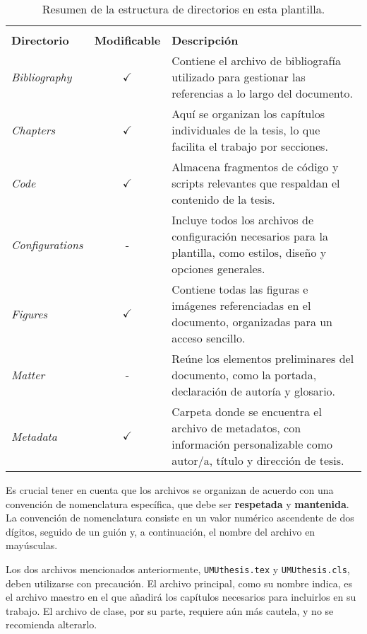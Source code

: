 {\begin{table}[!htpb]
    \setlength{\extrarowheight}{2pt}
    \caption[Estructura de directorios y organización de archivos]{Resumen de la estructura de directorios en esta plantilla.}
    \label{tab:file-structure}
    \begin{tabularx}{\textwidth}{lcX}
        \toprule
        \\[-1.5\normalbaselineskip]
        \textbf{Directorio} & \textbf{Modificable} & \textbf{Descripción} \\ [0em]
        \midrule
        \textit{Bibliography} & $\checkmark$ & Contiene el archivo de bibliografía utilizado para gestionar las referencias a lo largo del documento. \\
        \textit{Chapters} & $\checkmark$ & Aquí se organizan los capítulos individuales de la tesis, lo que facilita el trabajo por secciones. \\
        \textit{Code} & $\checkmark$ & Almacena fragmentos de código y scripts relevantes que respaldan el contenido de la tesis. \\
        \textit{Configurations} & - & Incluye todos los archivos de configuración necesarios para la plantilla, como estilos, diseño y opciones generales. \\
        \textit{Figures} & $\checkmark$ & Contiene todas las figuras e imágenes referenciadas en el documento, organizadas para un acceso sencillo. \\
        \textit{Matter} & - & Reúne los elementos preliminares del documento, como la portada, declaración de autoría y glosario. \\
        \textit{Metadata} & $\checkmark$ & Carpeta donde se encuentra el archivo de metadatos, con información personalizable como autor/a, título y dirección de tesis. \\
        \bottomrule
    \end{tabularx}
\end{table}


Es crucial tener en cuenta que los archivos se organizan de acuerdo con una convención de nomenclatura específica, que debe ser \textbf{respetada} y \textbf{mantenida}. La convención de nomenclatura consiste en un valor numérico ascendente de dos dígitos, seguido de un guión y, a continuación, el nombre del archivo en mayúsculas. 

Los dos archivos mencionados anteriormente, \texttt{UMUthesis.tex} y \texttt{UMUthesis.cls}, deben utilizarse con precaución. El archivo principal, como su nombre indica, es el archivo maestro en el que añadirá los capítulos necesarios para incluirlos en su trabajo. El archivo de clase, por su parte, requiere aún más cautela, y no se recomienda alterarlo.

}
